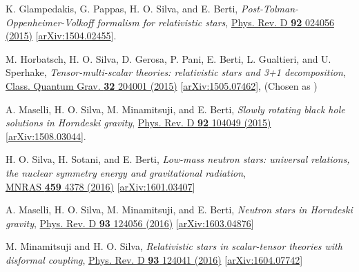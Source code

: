 \documentclass[10pt]{article}
\newcommand{\MYhref}[3][blue]{\href{#2}{\color{#1}{#3}}}
\begin{document}
\begin{bibenum}
    \item K. Glampedakis, G. Pappas, H. O. Silva, and E. Berti,
    \emph{Post-Tolman-Oppenheimer-Volkoff formalism for relativistic stars},
    \href{http://journals.aps.org/prd/abstract/10.1103/PhysRevD.92.024056}{Phys. Rev. D {\bf92} 024056 (2015)}
    [\href{http://arxiv.org/abs/1504.02455}{arXiv:1504.02455}].

    \item M. Horbatsch, H. O. Silva, D. Gerosa, P. Pani, E. Berti, L. Gualtieri,
    and U. Sperhake,
    \emph{Tensor-multi-scalar theories: relativistic stars and 3+1 decomposition},
    \href{http://iopscience.iop.org/article/10.1088/0264-9381/32/20/204001/meta;jsessionid=575DFA8E53663683D64E28DF82CE0294.c1}{Class. Quantum Grav.
    {\bf32} 204001 (2015)}
    [\href{http://arxiv.org/abs/1505.07462}{arXiv:1505.07462}],
    (Chosen as
    \MYhref[venetianred]{http://iopscience.iop.org/collections}{\sc IOPSelect})
    \label{itm:multiscalar}

    \item A. Maselli, H. O. Silva, M. Minamitsuji, and E. Berti,
    \emph{Slowly rotating black hole solutions in Horndeski gravity},
    \href{http://journals.aps.org/prd/abstract/10.1103/PhysRevD.92.104049}{Phys. Rev. D {\bf92} 104049 (2015)}
    [\href{http://arxiv.org/abs/1508.03044}{arXiv:1508.03044}].
    \label{itm:horndeski}

    \item H. O. Silva, H. Sotani, and E. Berti,
    \emph{Low-mass neutron stars: universal relations, the nuclear symmetry energy and gravitational radiation},\\
    \href{http://mnras.oxfordjournals.org/content/459/4/4378}{MNRAS {\bf459}
    4378 (2016)}
    [\href{http://arxiv.org/abs/1601.03407}{arXiv:1601.03407}]

    \item A. Maselli, H. O. Silva, M. Minamitsuji, and E. Berti,
    \emph{Neutron stars in Horndeski gravity},
    \href{http://journals.aps.org/prd/abstract/10.1103/PhysRevD.93.124056}{Phys. Rev. D {\bf93} 124056 (2016)}
    [\href{https://arxiv.org/abs/1603.04876}{arXiv:1603.04876}]

    \item M. Minamitsuji and H. O. Silva,
    \emph{Relativistic stars in scalar-tensor theories with disformal coupling},
    \href{http://journals.aps.org/prd/abstract/10.1103/PhysRevD.93.124056}{Phys. Rev. D {\bf93} 124041 (2016)}
    [\href{https://arxiv.org/abs/1604.07742}{arXiv:1604.07742}]
    \label{itm:disformal}


\end{bibenum}
\end{document}

